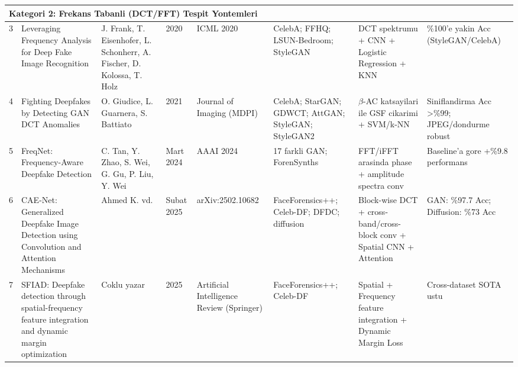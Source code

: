 \begin{landscape}
\begin{longtable}{@{}p{0.5cm} p{4.2cm} p{3.0cm} p{1.6cm} p{3.0cm} p{3.0cm} p{4.2cm} p{3.5cm}@{}}
\multicolumn{8}{l}{\textbf{Kategori 2: Frekans Tabanli (DCT/FFT) Tespit Yontemleri}} \\
\midrule
3 & Leveraging Frequency Analysis for Deep Fake Image Recognition & J. Frank, T. Eisenhofer, L. Schonherr, A. Fischer, D. Kolossa, T. Holz & 2020 & ICML 2020 & CelebA; FFHQ; LSUN-Bedroom; StyleGAN & DCT spektrumu + CNN + Logistic Regression + KNN & \%100'e yakin Acc (StyleGAN/CelebA) \\
\midrule
4 & Fighting Deepfakes by Detecting GAN DCT Anomalies & O. Giudice, L. Guarnera, S. Battiato & 2021 & Journal of Imaging (MDPI) & CelebA; StarGAN; GDWCT; AttGAN; StyleGAN; StyleGAN2 & $\beta$-AC katsayilari ile GSF cikarimi + SVM/k-NN & Siniflandirma Acc \textgreater \%99; JPEG/dondurme robust \\
\midrule
5 & FreqNet: Frequency-Aware Deepfake Detection & C. Tan, Y. Zhao, S. Wei, G. Gu, P. Liu, Y. Wei & Mart 2024 & AAAI 2024 & 17 farkli GAN; ForenSynths & FFT/iFFT arasinda phase + amplitude spectra conv & Baseline'a gore +\%9.8 performans \\
\midrule
6 & CAE-Net: Generalized Deepfake Image Detection using Convolution and Attention Mechanisms & Ahmed K. vd. & Subat 2025 & arXiv:2502.10682 & FaceForensics++; Celeb-DF; DFDC; diffusion & Block-wise DCT + cross-band/cross-block conv + Spatial CNN + Attention & GAN: \%97.7 Acc; Diffusion: \%73 Acc \\
\midrule
7 & SFIAD: Deepfake detection through spatial-frequency feature integration and dynamic margin optimization & Coklu yazar & 2025 & Artificial Intelligence Review (Springer) & FaceForensics++; Celeb-DF & Spatial + Frequency feature integration + Dynamic Margin Loss & Cross-dataset SOTA ustu \\
\midrule


\end{longtable}
\end{landscape}
